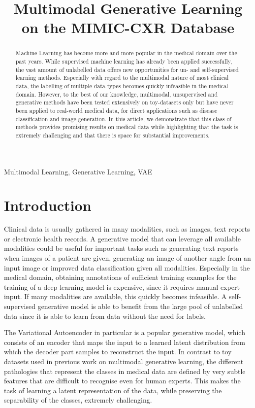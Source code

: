 \documentclass{midl} %
\title[Multimodal Generative Learning on the MIMIC-CXR Database]{Multimodal Generative Learning on the MIMIC-CXR Database}
\begin{document}
\maketitle
\begin{abstract}
    Machine Learning has become more and more popular in the medical domain over the past years.
    While supervised machine learning has already been applied successfully, the vast amount of unlabelled data offers new opportunities for un- and self-supervised learning methods. 
    Especially with regard to the multimodal nature of most clinical data, the labelling of multiple data types becomes quickly infeasible in the medical domain.
    However, to the best of our knowledge, multimodal, unsupervised and generative methods have been tested extensively on toy-datasets only but have never been applied to real-world medical data, for direct applications such as disease classification and image generation.
    In this article, we demonstrate that this class of methods provides promising results on medical data while highlighting that the task is extremely challenging and that there is space for substantial improvements.
\end{abstract}


\begin{keywords}
Multimodal Learning, Generative Learning, VAE
\end{keywords}

\section{Introduction}
Clinical data is usually gathered  in many modalities, such as images, text reports or electronic health records.
A generative model that can leverage all available modalities could be useful for important tasks such as generating text reports when images of a patient are given, generating an image of another angle from an input image or improved data classification given all modalities.
Especially in the medical domain, obtaining annotations of sufficient training examples for the training of a deep learning model is expensive, since it requires manual expert input. If many modalities are available, this quickly becomes infeasible.
A self-supervised generative model is able to benefit from the large pool of unlabelled data since it is able to learn from data without the need for labels.

The Variational Autoencoder \citep[VAE]{kingma2014autoencoding} in particular is a popular generative model, which consists of an encoder that maps the input to a learned latent distribution from which the decoder part samples to reconstruct the input.
In contrast to toy datasets used in previous work on multimodal generative learning, the different pathologies that represent the classes in medical data are defined by very subtle features that are difficult to recognise even for human experts.
This makes the task of learning a latent representation of the data, while preserving the separability of the classes, extremely challenging.
\end{document}
